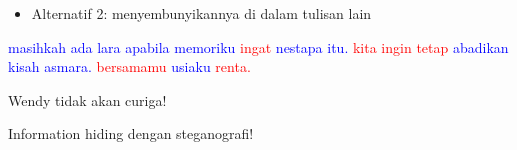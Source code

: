 \documentclass{article}
\begin{document}

\begin{itemize}
  \item Alternatif 2: menyembunyikannya di dalam tulisan lain
\end{itemize}

\textcolor{blue}{masihkah} \textcolor{blue}{ada} \textcolor{blue}{lara} \textcolor{blue}{apabila} \textcolor{blue}{memoriku} \textcolor{red}{ingat} \textcolor{blue}{nestapa} \textcolor{blue}{itu.} \textcolor{red}{kita} \textcolor{red}{ingin} \textcolor{red}{tetap}
\textcolor{blue}{abadikan} \textcolor{blue}{kisah} \textcolor{blue}{asmara.} \textcolor{red}{bersamamu} \textcolor{blue}{usiaku} \textcolor{red}{renta.}

\vspace{5mm}

Wendy tidak akan curiga!

\vspace{5mm}

Information hiding dengan steganografi!
\end{document}
